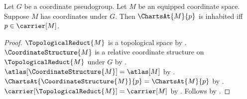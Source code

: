 \begin{theorem}\label{equipped_charts_at_inhabited_iff}
    Let $G$ be a coordinate pseudogroup.
    Let $M$ be an equipped coordinate space.
    Suppose $M$ has coordinates under $G$.
    Then $\ChartsAt{M}{p}$ is inhabited iff $p\in\carrier[M]$.
\end{theorem}
\begin{proof}
    $\TopologicalReduct{M}$ is a topological space by
        .
    $\CoordinateStructure{M}$ is a relative coordinate structure
        on $\TopologicalReduct{M}$ under $G$ by .
    $\atlas[\CoordinateStructure{M}]=\atlas[M]$ by
        .
    $\ChartsAt{\CoordinateStructure{M}}{p}=\ChartsAt{M}{p}$ by .
    $\carrier[\TopologicalReduct{M}]=\carrier[M]$ by
        .
    Follows by .
\end{proof}
